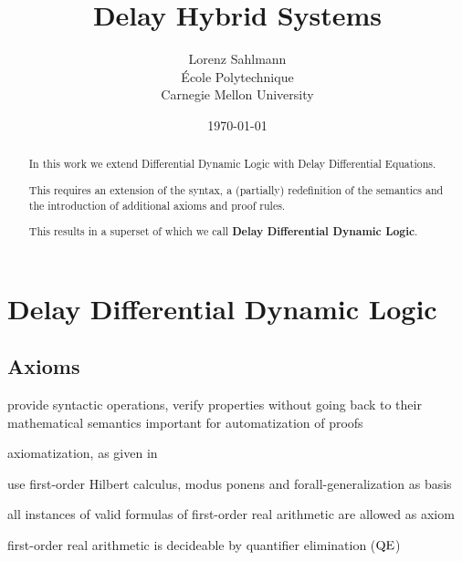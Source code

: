 \documentclass[10pt]{report}
\begin{document}
\title{Delay Hybrid Systems}

\author{Lorenz Sahlmann\\ École Polytechnique\\ Carnegie Mellon University}
\date{\today}

\maketitle

\begin{abstract}
    In this work we extend Differential Dynamic Logic with Delay Differential Equations.

    This requires an extension of the syntax, a (partially) redefinition of the semantics and the introduction of additional axioms and proof rules.

    This results in a superset of \dL which we call \textbf{Delay Differential Dynamic Logic}.
\end{abstract}

%







%
\chapter{Delay Differential Dynamic Logic}
\label{sec:delay-differential-dynamic-logic}

\section{Axioms}
    \label{sec:axioms}

    provide syntactic operations, verify properties without going back to their mathematical semantics
    important for automatization of proofs

    \dL axiomatization, as given in \cite{Platzer12Complete}

    use first-order Hilbert calculus, modus ponens and forall-generalization as basis

    all instances of valid formulas of first-order real arithmetic are allowed as axiom

    first-order real arithmetic is decideable by quantifier elimination ($\operatorname{QE}$)
\end{document}
